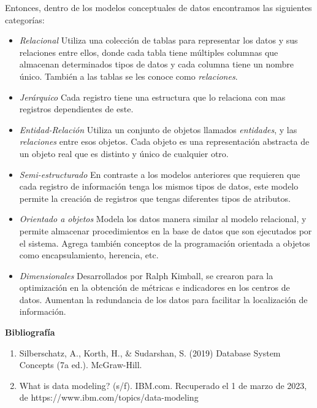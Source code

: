 \documentclass[a4paper,12pt]{report}
\begin{document}
Entonces, dentro de los modelos conceptuales de datos encontramos las siguientes categorías:

\begin{itemize}
	\item\emph{Relacional}
	Utiliza una colección de tablas para representar los datos y sus relaciones entre ellos, donde cada tabla tiene múltiples columnas que almacenan determinados tipos de datos  y cada columna tiene un nombre único. También a las tablas se les conoce como \emph{relaciones}.
	\item\emph{Jerárquico}
	Cada registro tiene una estructura que lo relaciona con mas registros dependientes de este.
	\item\emph{Entidad-Relación}
	Utiliza un conjunto de objetos llamados \emph{entidades}, y las \emph{relaciones} entre esos objetos. Cada objeto es una representación abstracta de un objeto real que es distinto y único de cualquier otro.
	\item\emph{Semi-estructurado}
	En contraste a los modelos anteriores que requieren que cada registro de información tenga los mismos tipos de datos, este modelo permite la creación de registros que tengas diferentes tipos de atributos.
	\item\emph{Orientado a objetos}
	Modela los datos manera similar al modelo relacional, y permite almacenar procedimientos en la base de datos que son ejecutados por el sistema. Agrega también conceptos de la programación orientada a objetos como encapsulamiento, herencia, etc.
	\item\emph{Dimensionales}
	Desarrollados por Ralph Kimball, se crearon para la optimización en la obtención de métricas e indicadores en los centros de datos. Aumentan la redundancia de los datos para facilitar la localización de información.
\end{itemize}

\newpage

\textbf{Bibliografía}

\begin{enumerate}
	\item Silberschatz, A., Korth, H., \& Sudarshan, S. (2019) Database System Concepts (7a ed.). McGraw-Hill.
	\item What is data modeling? (s/f). IBM.com. Recuperado el 1 de marzo de 2023, de https://www.ibm.com/topics/data-modeling
\end{enumerate}
\end{document}
